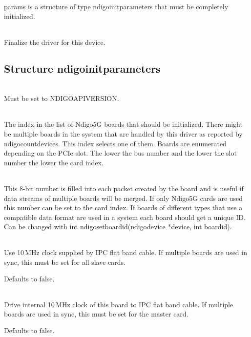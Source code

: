         \textsf{params} is a structure of type \textsf{ndigo\tu init\tu parameters} that must be completely initialized.\par

        \\
        Finalize the driver for this device.

        \subsection{Structure ndigo\tu init\tu parameters}

            \\
            Must be set to \textsf{NDIGO\tu API\tu VERSION}.\par

            \\
            The index in the list of Ndigo5G boards that should be initialized. There might be multiple boards in the system that are handled by this driver as reported by \textsf{ndigo\tu count\tu devices}. This index selects one of them. Boards are enumerated depending on the PCIe slot. The lower the bus number and the lower the slot number the lower the card index.\par

            \\
            This 8-bit number is filled into each packet created by the board and is useful if data streams of multiple boards will be merged. If only Ndigo5G cards are used this number can be set to the card index. If boards of different types that use a compatible data format are used in a system each board should get a unique ID. Can be changed with \textsf{int ndigo\tu set\tu board\tu id(ndigo\tu device *device, int board\tu id)}.\par

            \\
            Use 10\,MHz clock supplied by IPC flat band cable. If multiple 
            boards are used in sync, this must be set for all slave cards.\par
            Defaults to false.\par

            \\
            Drive internal 10\,MHz clock of this board to IPC flat band cable. If multiple boards are used in sync, this must be set for the master card.\par
            Defaults to false.\par

